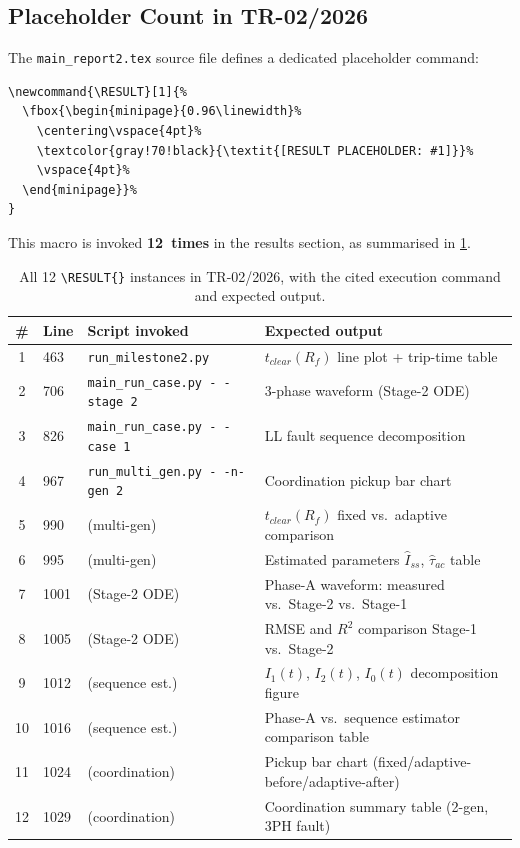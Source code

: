 \documentclass[12pt,a4paper]{article}
\begin{document}
\subsection{Placeholder Count in TR-02/2026}
\label{sec:ev:placeholders}

The \texttt{main\_report2.tex} source file defines a dedicated placeholder command:

\begin{verbatim}
\newcommand{\RESULT}[1]{%
  \fbox{\begin{minipage}{0.96\linewidth}%
    \centering\vspace{4pt}%
    \textcolor{gray!70!black}{\textit{[RESULT PLACEHOLDER: #1]}}%
    \vspace{4pt}%
  \end{minipage}}%
}
\end{verbatim}

\noindent This macro is invoked \textbf{12~times} in the results section, as summarised
in \cref{tab:placeholders}.

\begin{table}[H]
\centering
\caption{All 12 \texttt{\textbackslash RESULT\{\}} instances in TR-02/2026,
         with the cited execution command and expected output.}
\label{tab:placeholders}
\small
\begin{tabular}{clll}
\toprule
\# & Line & Script invoked & Expected output \\
\midrule
1  & 463 & \texttt{run\_milestone2.py} & $t_{clear}(R_f)$ line plot + trip-time table \\
2  & 706 & \texttt{main\_run\_case.py \texttt{-\,-}stage 2} & 3-phase waveform (Stage-2 ODE) \\
3  & 826 & \texttt{main\_run\_case.py \texttt{-\,-}case 1} & LL fault sequence decomposition \\
4  & 967 & \texttt{run\_multi\_gen.py \texttt{-\,-}n-gen 2} & Coordination pickup bar chart \\
5  & 990 & (multi-gen) & $t_{clear}(R_f)$ fixed vs.\ adaptive comparison \\
6  & 995 & (multi-gen) & Estimated parameters $\hat{I}_{ss}$, $\hat{\tau}_{ac}$ table \\
7  & 1001 & (Stage-2 ODE) & Phase-A waveform: measured vs.\ Stage-2 vs.\ Stage-1 \\
8  & 1005 & (Stage-2 ODE) & RMSE and $R^2$ comparison Stage-1 vs.\ Stage-2 \\
9  & 1012 & (sequence est.) & $I_1(t)$, $I_2(t)$, $I_0(t)$ decomposition figure \\
10 & 1016 & (sequence est.) & Phase-A vs.\ sequence estimator comparison table \\
11 & 1024 & (coordination) & Pickup bar chart (fixed/adaptive-before/adaptive-after) \\
12 & 1029 & (coordination) & Coordination summary table (2-gen, 3PH fault) \\
\bottomrule
\end{tabular}
\end{table}
\end{document}
